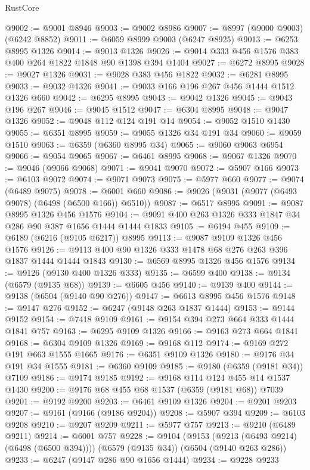 \begin{lexlean}{RustCore}
\begin{coremodule}
@9002 := @9001 @8946
@9003 := @9002 @8986
@9007 := @8997 (@9000 @9003) (@6242 @8852)
@9011 := @6059 @8999 @9003 (@6247 @8925)
@9013 := @6253 @8995 @1326
@9014 := @9013 @1326
@9026 := @9014 @333 @456 @1576 @383 @400 @264 @1822 @1848 @90 @1398 @394 @1404
@9027 := @6272 @8995
@9028 := @9027 @1326
@9031 := @9028 @383 @456 @1822
@9032 := @6281 @8995
@9033 := @9032 @1326
@9041 := @9033 @166 @196 @267 @456 @1444 @1512 @1326 @660
@9042 := @6295 @8995
@9043 := @9042 @1326
@9045 := @9043 @196 @267
@9046 := @9045 @1512
@9047 := @6304 @8995
@9048 := @9047 @1326
@9052 := @9048 @112 @124 @191 @14
@9054 := @9052 @1510 @1430
@9055 := @6351 @8995
@9059 := @9055 @1326 @34 @191 @34
@9060 := @9059 @1510
@9063 := @6359 (@6360 @8995 @34)
@9065 := @9060 @9063 @6954
@9066 := @9054 @9065
@9067 := @6461 @8995
@9068 := @9067 @1326
@9070 := @9046 (@9066 @9068)
@9071 := @9041 @9070
@9072 := @5907 @166
@9073 := @6103 @9072
@9074 := @9071 @9073
@9075 := @5977 @660
@9077 := @9074 (@6489 @9075)
@9078 := @6001 @660
@9086 := @9026 (@9031 (@9077 (@6493 @9078) (@6498 (@6500 @166)) @6510))
@9087 := @6517 @8995
@9091 := @9087 @8995 @1326 @456 @1576
@9104 := @9091 @400 @263 @1326 @333 @1847 @34 @286 @90 @387 @1656 @1444 @1444 @1833
@9105 := @6194 @455
@9109 := @6189 (@6216 (@9105 @6217)) @8995
@9113 := @9087 @9109 @1326 @456 @1576
@9126 := @9113 @400 @90 @1326 @333 @1478 @68 @276 @263 @396 @1837 @1444 @1444 @1843
@9130 := @6569 @8995 @1326 @456 @1576
@9134 := @9126 (@9130 @400 @1326 @333)
@9135 := @6599 @400
@9138 := @9134 (@6579 (@9135 @68))
@9139 := @6605 @456
@9140 := @9139 @400
@9144 := @9138 (@6504 (@9140 @90 @276))
@9147 := @6613 @8995 @456 @1576
@9148 := @9147 @276
@9152 := @6247 (@9148 @263 @1837 @1444)
@9153 := @9144 @9152
@9154 := @7418 @9109
@9161 := @9154 @394 @273 @664 @333 @1444 @1841 @757
@9163 := @6295 @9109 @1326
@9166 := @9163 @273 @664 @1841
@9168 := @6304 @9109 @1326
@9169 := @9168 @112
@9174 := @9169 @272 @191 @663 @1555 @1665
@9176 := @6351 @9109 @1326
@9180 := @9176 @34 @191 @34 @1555
@9181 := @6360 @9109
@9185 := @9180 (@6359 (@9181 @34)) @7109
@9186 := @9174 @9185
@9192 := @9168 @114 @124 @455 @14 @1537 @1430
@9200 := @9176 @68 @455 @68 @1537 (@6359 (@9181 @68)) @7039
@9201 := @9192 @9200
@9203 := @6461 @9109 @1326
@9204 := @9201 @9203
@9207 := @9161 (@9166 (@9186 @9204))
@9208 := @5907 @394
@9209 := @6103 @9208
@9210 := @9207 @9209
@9211 := @5977 @757
@9213 := @9210 (@6489 @9211)
@9214 := @6001 @757
@9228 := @9104
    (@9153 (@9213 (@6493 @9214) (@6498 (@6500 @394))))
    (@6579 (@9135 @34))
    (@6504 (@9140 @263 @286))
@9233 := @6247 (@9147 @286 @90 @1656 @1444)
@9234 := @9228 @9233

\end{coremodule}
\end{lexlean}
